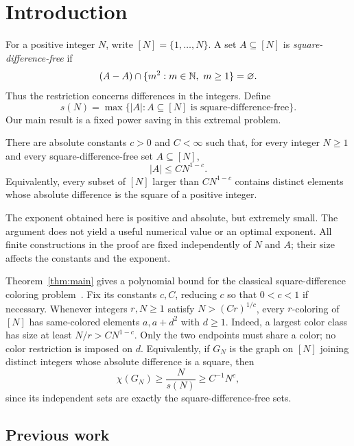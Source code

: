 \section{Introduction}
\label{sec:introduction}

For a positive integer $N$, write $[N]=\{1,\ldots,N\}$. A set
$A\subseteq[N]$ is \emph{square-difference-free} if
\[
 (A-A)\cap\{m^2:m\in\N,\ m\ge1\}=\varnothing.
\]
Thus the restriction concerns differences in the integers. Define
\[
 s(N)=\max\{|A|:A\subseteq[N]\text{ is square-difference-free}\}.
\]
Our main result is a fixed power saving in this extremal problem.

\begin{theorem}
\label{thm:main}
There are absolute constants $c>0$ and $C<\infty$ such that, for every
integer $N\ge1$ and every square-difference-free set $A\subseteq[N]$,
\[
 |A|\le C N^{1-c}.
\]
Equivalently, every subset of $[N]$ larger than $C N^{1-c}$ contains
distinct elements whose absolute difference is the square of a positive
integer.
\end{theorem}

The exponent obtained here is positive and absolute, but extremely small.
The argument does not yield a useful numerical value or an optimal exponent.
All finite constructions in the proof are fixed independently of $N$ and
$A$; their size affects the constants and the exponent.

\begin{remark}
Theorem~\ref{thm:main} gives a polynomial bound for the classical
square-difference coloring problem~\cite[Section~4]{BeigelGasarch2008}.
Fix its constants $c,C$, reducing $c$ so that $0<c<1$ if necessary.
Whenever integers $r,N\ge1$ satisfy $N>(Cr)^{1/c}$, every $r$-coloring
of $[N]$ has same-colored elements $a,a+d^2$ with $d\ge1$.
Indeed, a largest color class has size at least $N/r>C N^{1-c}$.
Only the two endpoints must share a color; no color restriction is
imposed on $d$. Equivalently, if $G_N$ is the graph on $[N]$ joining
distinct integers whose absolute difference is a square, then
\[
 \chi(G_N)\ge \frac{N}{s(N)}\ge C^{-1}N^c,
\]
since its independent sets are exactly the square-difference-free sets.
\end{remark}

\subsection{Previous work}

